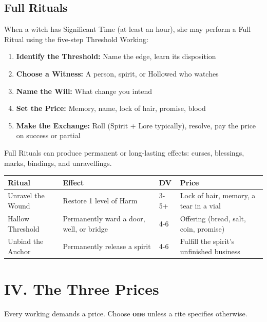 \documentclass[11pt,letterpaper]{article}
\begin{document}
\subsection{Full Rituals}

When a witch has Significant Time (at least an hour), she may perform a Full Ritual using the five-step Threshold Working:

\begin{enumerate}
    \item \textbf{Identify the Threshold:} Name the edge, learn its disposition
    \item \textbf{Choose a Witness:} A person, spirit, or Hollowed who watches
    \item \textbf{Name the Will:} What change you intend
    \item \textbf{Set the Price:} Memory, name, lock of hair, promise, blood
    \item \textbf{Make the Exchange:} Roll (Spirit + Lore typically), resolve, pay the price on success or partial
\end{enumerate}

Full Rituals can produce permanent or long-lasting effects: curses, blessings, marks, bindings, and unravellings.

\begin{table}[H]
\centering
\begin{tabularx}{0.95\linewidth}{@{}lXXX@{}}
\toprule
\textbf{Ritual} & \textbf{Effect} & \textbf{DV} & \textbf{Price} \\
\midrule
Unravel the Wound & Restore 1 level of Harm & 3-5+ & Lock of hair, memory, a tear in a vial \\
Hallow Threshold & Permanently ward a door, well, or bridge & 4-6 & Offering (bread, salt, coin, promise) \\
Unbind the Anchor & Permanently release a spirit & 4-6 & Fulfill the spirit's unfinished business \\
\bottomrule
\end{tabularx}
\end{table}

\section{IV. The Three Prices}

Every working demands a price. Choose \textbf{one} unless a rite specifies otherwise.
\end{document}
